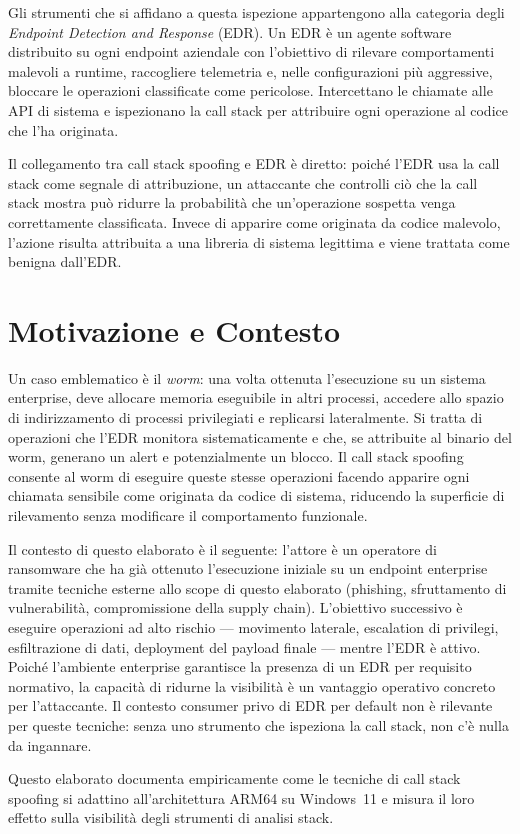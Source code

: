 Gli strumenti che si affidano a questa ispezione appartengono alla categoria
degli \emph{Endpoint Detection and Response} (EDR). Un EDR è un agente software
distribuito su ogni endpoint aziendale con l'obiettivo di rilevare comportamenti
malevoli a runtime, raccogliere telemetria e, nelle configurazioni più
aggressive, bloccare le operazioni classificate come pericolose. Intercettano le
chiamate alle API di sistema e ispezionano la call stack per attribuire ogni
operazione al codice che l'ha originata.

Il collegamento tra call stack spoofing e EDR è diretto: poiché l'EDR usa la
call stack come segnale di attribuzione, un attaccante che controlli ciò che la
call stack mostra può ridurre la probabilità che un'operazione sospetta venga
correttamente classificata. Invece di apparire come originata da codice malevolo,
l'azione risulta attribuita a una libreria di sistema legittima e viene trattata
come benigna dall'EDR.


\section{Motivazione e Contesto}
\label{sec:motivazione}

Un caso emblematico è il \emph{worm}: una volta ottenuta l'esecuzione su un
sistema enterprise, deve allocare memoria eseguibile in altri processi, accedere
allo spazio di indirizzamento di processi privilegiati e replicarsi lateralmente.
Si tratta di operazioni che l'EDR monitora sistematicamente e che, se attribuite
al binario del worm, generano un alert e potenzialmente un blocco. Il call stack
spoofing consente al worm di eseguire queste stesse operazioni facendo apparire
ogni chiamata sensibile come originata da codice di sistema, riducendo la
superficie di rilevamento senza modificare il comportamento funzionale.

Il contesto di questo elaborato è il seguente: l'attore è un operatore di
ransomware che ha già ottenuto l'esecuzione iniziale su un endpoint enterprise
tramite tecniche esterne allo scope di questo elaborato (phishing, sfruttamento
di vulnerabilità, compromissione della supply chain). L'obiettivo successivo è
eseguire operazioni ad alto rischio --- movimento laterale, escalation di
privilegi, esfiltrazione di dati, deployment del payload finale --- mentre
l'EDR è attivo. Poiché l'ambiente enterprise garantisce la presenza di un EDR
per requisito normativo, la capacità di ridurne la visibilità è un vantaggio
operativo concreto per l'attaccante. Il contesto consumer privo di EDR per
default non è rilevante per queste tecniche: senza uno strumento che ispeziona
la call stack, non c'è nulla da ingannare.

Questo elaborato documenta empiricamente come le tecniche di call stack spoofing
si adattino all'architettura ARM64 su Windows~11 e misura il loro effetto sulla
visibilità degli strumenti di analisi stack.
